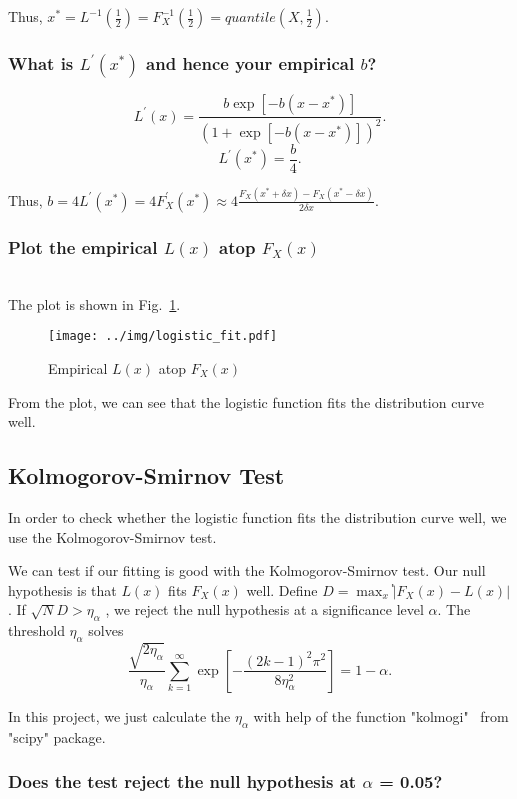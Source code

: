 \documentclass[runningheads]{llncs}
\begin{document}
Thus, $x^*=L^{-1}(\frac12)=F_X^{-1}(\frac12)=quantile(X,\frac12)$.
\subsubsection*{What is $L^{'}(x^*)$ and hence your empirical $b$?}
$$
    L^{'}(x) = \frac{b\exp[-b(x-x^*)]}{(1+\exp[-b(x-x^*)])^2} .
$$
$$
    L^{'}(x^*) = \frac{b}{4} .
$$

Thus, $b=4L^{'}(x^*)=4F_X^{'}(x^*)\approx 4\frac{F_X(x^*+\delta x)-F_X(x^*-\delta x)}{2\delta x}$.

\subsubsection*{Plot the empirical $L(x)$ atop $F_X(x)$}

\hfill\\
The plot is shown in Fig.~\ref{fig:logistic}.

\begin{figure}
    \centering
    \texttt{[image: ../img/logistic\_fit.pdf]}
    \caption{Empirical $L(x)$ atop $F_X(x)$}
    \label{fig:logistic}
\end{figure}

From the plot, we can see that the logistic function fits the distribution curve well.

\subsection{Kolmogorov-Smirnov Test}

In order to check whether the logistic function fits the distribution curve well, we use the Kolmogorov-Smirnov test.

We can test if our fitting is good with the Kolmogorov-Smirnov test. Our null
hypothesis is that $L(x)$ fits $F_X (x)$ well. Define $D = \max_x֓|F_X(x) - L(x)|$.
If $\sqrt{N} D > \eta_{\alpha}$ , we reject the null hypothesis at a significance level $\alpha$. The
threshold $\eta_{\alpha}$ solves
$$
    \frac{\sqrt{2\eta_{\alpha}}}{\eta_{\alpha}}\sum_{k=1}^{\infty}\exp\left[-\frac{(2k-1)^2\pi^2}{8\eta_{\alpha}^2}\right]=1-\alpha.
$$

In this project, we just calculate the $\eta_{\alpha}$ with help of the function "kolmogi"~\cite{kolmogi} from "scipy" package.

\subsubsection*{Does the test reject the null hypothesis at $\alpha$ = 0.05?}
\end{document}
